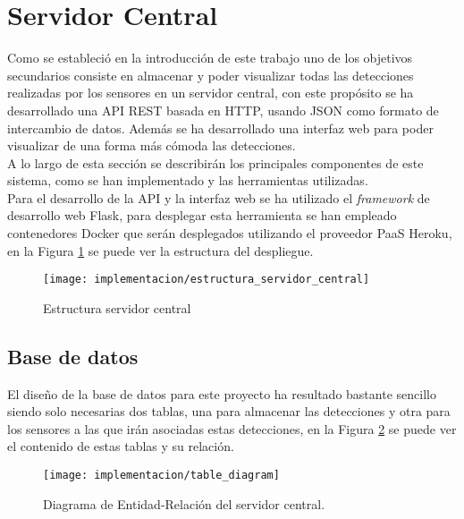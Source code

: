 \documentclass[../proyecto.tex]{subfiles}
\begin{document}
\section{Servidor Central}\label{sect:impementacion_servidor_central}

Como se estableció en la introducción de este trabajo uno de los objetivos secundarios consiste en almacenar y poder visualizar todas las detecciones realizadas por los sensores en un servidor central, con este propósito se ha desarrollado una API REST basada en HTTP, usando JSON como formato de intercambio de datos. Además se ha desarrollado una interfaz web para poder visualizar de una forma más cómoda las detecciones.\\

A lo largo de esta sección se describirán los principales componentes de este sistema, como se han implementado y las herramientas utilizadas.\\

Para el desarrollo de la API y la interfaz web se ha utilizado el \textit{framework} de desarrollo web Flask, para desplegar esta herramienta se han empleado contenedores Docker que serán desplegados utilizando el proveedor PaaS Heroku, en la Figura \ref{fig:estructura_servidor_central} se puede ver la estructura del despliegue.\\

\begin{figure}[H]
\centering
\texttt{[image: implementacion/estructura\_servidor\_central]}
\caption{Estructura servidor central }
\label{fig:estructura_servidor_central}
\end{figure}

\subsection{Base de datos}

El diseño de la base de datos para este proyecto ha resultado bastante sencillo siendo solo necesarias dos tablas, una para almacenar las detecciones y otra para los sensores a las que irán asociadas estas detecciones, en la Figura \ref{fig:table_diagram} se puede ver el contenido de estas tablas y su relación.

\begin{figure}[H]
\centering
\texttt{[image: implementacion/table\_diagram]}
\caption{Diagrama de Entidad-Relación del servidor central.}
\label{fig:table_diagram}
\end{figure}
\end{document}
